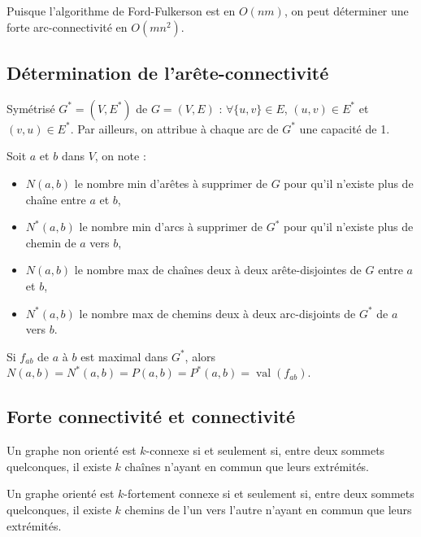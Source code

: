 \documentclass[a4paper,11pt,twocolumn]{article}
\DeclareMathOperator{\val}{val}
\begin{document}
		Puisque l'algorithme de Ford-Fulkerson est en $O(nm)$, on peut déterminer une forte arc-connectivité en $O(mn^2)$.

	\subsection{Détermination de l'arête-connectivité}

		\begin{note}
		Symétrisé $G^* = (V,E^*)$ de $G = (V,E)$ : $\forall \{ u,v \} \in E$, $(u,v) \in E^*$ et $(v,u) \in E^*$.
		Par ailleurs, on attribue à chaque arc de $G^*$ une capacité de 1.
		\end{note}

		\begin{note}
		Soit $a$ et $b$ dans $V$, on note :
			\begin{itemize}
			\item $N(a,b)$ le nombre min d’arêtes à supprimer de $G$ pour qu’il n’existe plus de chaîne entre $a$ et $b$,
			\item $N^*(a,b)$ le nombre min d’arcs à supprimer de $G^*$ pour qu’il n’existe plus de chemin de $a$ vers $b$,
			\item $N(a,b)$ le nombre max de chaînes deux à deux arête-disjointes de $G$ entre $a$ et $b$,
			\item $N^*(a,b)$ le nombre max de chemins deux à deux arc-disjoints de $G^*$ de $a$ vers $b$.
			\end{itemize}
		\end{note}

		\begin{thm}
		Si $f_{ab}$ de $a$ à $b$ est maximal dans $G^*$, alors $N(a,b) = N^*(a,b) = P(a,b) = P^*(a,b) = \val(f_{ab})$.
		\end{thm}

	\subsection{Forte connectivité et connectivité}

		\begin{thm}[Menger]
		Un graphe non orienté est $k$-connexe si et seulement si, entre deux sommets quelconques, il existe $k$ chaînes n’ayant en commun que leurs extrémités.
		\end{thm}

		\begin{thm}[Menger]
		Un graphe orienté est $k$-fortement connexe si et seulement si, entre deux sommets quelconques, il existe $k$ chemins de l'un vers l'autre n’ayant en commun que leurs extrémités.
		\end{thm}
\end{document}
